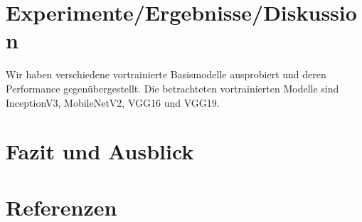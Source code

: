 \documentclass{article}
\begin{document}
\section{Experimente/Ergebnisse/Diskussion}

Wir haben verschiedene vortrainierte Basismodelle ausprobiert und deren Performance gegenübergestellt. Die betrachteten vortrainierten Modelle sind InceptionV3, MobileNetV2, VGG16 und VGG19.

\section{Fazit und Ausblick}


\section*{Referenzen}
\end{document}
